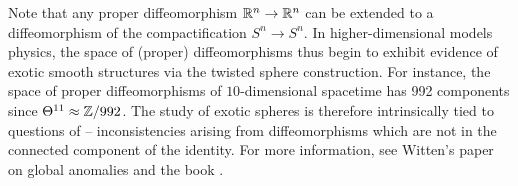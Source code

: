 	Note that any proper diffeomorphism $\mathbb{R}^n \to \mathbb{R}^n$ can be extended to a diffeomorphism of the compactification $S^{n} \to S^n$. In higher-dimensional models physics, the space of (proper) diffeomorphisms thus begin to exhibit evidence of exotic smooth structures via the twisted sphere construction. For instance, the space of proper diffeomorphisms of $10$-dimensional spacetime has 992 components since $\Theta^{11}\approx \mathbb{Z}/992$. The study of exotic spheres is therefore intrinsically tied to questions of  -- inconsistencies arising from diffeomorphisms which are not in the connected component of the identity. For more information, see Witten's paper \cite{witten1985anomalies} on global anomalies and the book \cite{baadhio1996quantum}.
	\smallrule
